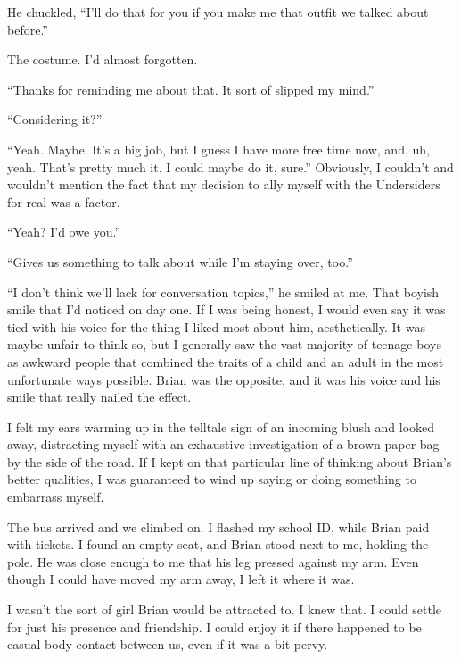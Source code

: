 He chuckled, ``I'll do that for you if you make me that outfit we talked about before.''



The costume.  I'd almost forgotten.



``Thanks for reminding me about that.  It sort of slipped my mind.''



``Considering it?''



``Yeah.  Maybe.  It's a big job, but I guess I have more free time now, and, uh, yeah.  That's pretty much it.  I could maybe do it, sure.''  Obviously, I couldn't and wouldn't mention the fact that my decision to ally myself with the Undersiders for real was a factor.



``Yeah?  I'd owe you.''



``Gives us something to talk about while I'm staying over, too.''



``I don't think we'll lack for conversation topics,'' he smiled at me.  That boyish smile that I'd noticed on day one.  If I was being honest, I would even say it was tied with his voice for the thing I liked most about him, aesthetically.  It was maybe unfair to think so, but I generally saw the vast majority of teenage boys as awkward people that combined the traits of a child and an adult in the most unfortunate ways possible.  Brian was the opposite, and it was his voice and his smile that really nailed the effect.



I felt my ears warming up in the telltale sign of an incoming blush and looked away, distracting myself with an exhaustive investigation of a brown paper bag by the side of the road.  If I kept on that particular line of thinking about Brian's better qualities, I was guaranteed to wind up saying or doing something to embarrass myself.



The bus arrived and we climbed on.  I flashed my school ID, while Brian paid with tickets.  I found an empty seat, and Brian stood next to me, holding the pole.  He was close enough to me that his leg pressed against my arm.  Even though I could have moved my arm away, I left it where it was.



I wasn't the sort of girl Brian would be attracted to.  I knew that.  I could settle for just his presence and friendship.  I could enjoy it if there happened to be casual body contact between us, even if it was a bit pervy.



